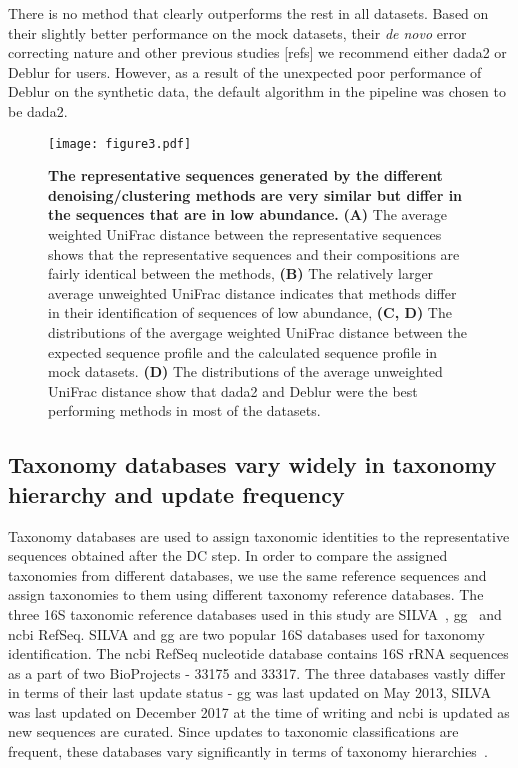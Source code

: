   There is no method that clearly outperforms the rest in all datasets.
  Based on their slightly better performance on the mock datasets, their \textit{de novo} error correcting nature and other previous studies [refs] we recommend either \ac{dada2} or Deblur for users.
  However, as a result of the unexpected poor performance of Deblur on the synthetic data, the default algorithm in the pipeline was chosen to be \ac{dada2}.

  \begin{figure}
    \centering
    \texttt{[image: figure3.pdf]}
    \caption{
      \textbf{The representative sequences generated by the different denoising/clustering methods are very similar but differ in the sequences that are in low abundance.}
      \textbf{(A)} The average weighted UniFrac distance between the representative sequences shows that the representative sequences and their compositions are fairly identical between the methods,
      \textbf{(B)} The relatively larger average unweighted UniFrac distance indicates that methods differ in their identification of sequences of low abundance,
      \textbf{(C, D)} The distributions of the avergage weighted UniFrac distance between the expected sequence profile and the calculated sequence profile in mock datasets.
      \textbf{(D)} The distributions of the average unweighted UniFrac distance show that dada2 and Deblur were the best performing methods in most of the datasets.
    }
    \label{fig:figure3}
  \end{figure}

  \FloatBarrier

  \subsection*{Taxonomy databases vary widely in taxonomy hierarchy and update frequency}

  Taxonomy databases are used to assign taxonomic identities to the representative sequences obtained after the DC step.
  In order to compare the assigned taxonomies from different databases, we use the same reference sequences and assign taxonomies to them using different taxonomy reference databases.
  The three 16S taxonomic reference databases used in this study are SILVA~\cite{Quast2012}, \ac{gg}~\cite{DeSantis2006} and \ac{ncbi} RefSeq.
  SILVA and \ac{gg} are two popular 16S databases used for taxonomy identification.
  The \ac{ncbi} RefSeq nucleotide database contains 16S rRNA sequences as a part of two BioProjects - 33175 and 33317.
  The three databases vastly differ in terms of their last update status - \ac{gg} was last updated on May 2013, SILVA was last updated on December 2017 at the time of writing and \ac{ncbi} is updated as new sequences are curated.
  Since updates to taxonomic classifications are frequent, these databases vary significantly in terms of taxonomy hierarchies~\cite{Balvociute2017}.

